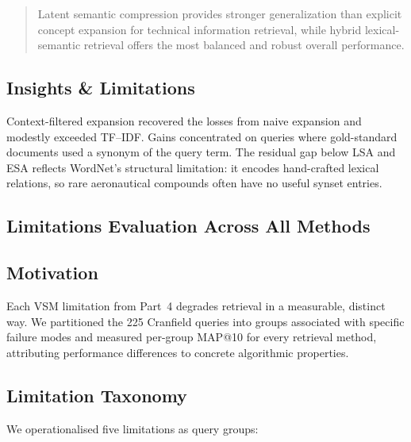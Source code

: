 \documentclass[runningheads]{llncs}
\begin{document}
\begin{quote}
Latent semantic compression provides stronger generalization than explicit concept
expansion for technical information retrieval, while hybrid lexical-semantic retrieval
offers the most balanced and robust overall performance.
\end{quote}

\subsection{Insights \& Limitations}

Context-filtered expansion recovered the losses from naive expansion and
modestly exceeded TF--IDF. Gains concentrated on queries where
gold-standard documents used a synonym of the query term. The residual
gap below LSA and ESA reflects WordNet's structural limitation: it
encodes hand-crafted lexical relations, so rare aeronautical compounds
often have no useful synset entries.

\subsection{Limitations Evaluation Across All Methods}

\subsection{Motivation}

Each VSM limitation from Part~4 degrades retrieval in a measurable,
distinct way. We partitioned the 225 Cranfield queries into groups
associated with specific failure modes and measured per-group MAP@10
for every retrieval method, attributing performance differences to
concrete algorithmic properties.

\subsection{Limitation Taxonomy}

We operationalised five limitations as query groups:
\end{document}
